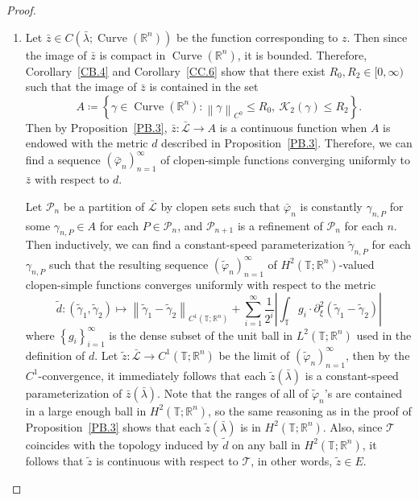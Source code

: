 \documentclass[reqno,centertags,12pt]{amsart}
\theoremstyle{definition}
\numberwithin{equation}{section}
\newcommand{\abs}[1]{\left\lvert#1\right\rvert}
\newcommand{\norm}[1]{\left\|#1\right\|}
\newcommand{\set}[1]{\left\{ #1 \right\}}
\newcommand{\setbc}[2]{\left\{ #1\colon#2 \right\}}
\newcommand{\seq}[1]{\left( #1 \right)}
\newcommand{\bbR}{{\mathbb{R}}}
\newcommand{\bbT}{{\mathbb{T}}}
\begin{document}
\begin{proof}
    \begin{enumerate}
        \item Let $\bar{z}\in C(\bar{\lambda};\operatorname{Curve}(\bbR^{n}))$ be the function
        corresponding to $z$. Then since the image of $\bar{z}$ is compact in
        $\operatorname{Curve}(\bbR^{n})$, it is bounded. Therefore,
        Corollary~\ref{CB.4} and
        Corollary~\ref{CC.6} show that
        there exist $R_{0},R_{2}\in[0,\infty)$ such that the image of $\bar{z}$
        is contained in the set
        \[
            A\coloneqq\setbc{\gamma\in\operatorname{Curve}(\bbR^{n})}
            {\norm{\gamma}_{C^{0}}\leq R_{0},\ \mathcal{K}_{2}(\gamma)\leq R_{2}}.
        \]
        Then by Proposition~\ref{PB.3},
        $\bar{z}\colon\bar{\mathcal{L}}\to A$ is a continuous function when $A$
        is endowed with the metric $d$ described in Proposition~\ref{PB.3}.
        Therefore, we can find a sequence
        $\seq{\bar{\varphi}_{n}}_{n=1}^{\infty}$ of clopen-simple functions
        converging uniformly to $\bar{z}$ with respect to $d$.

        Let $\mathcal{P}_{n}$ be a partition of $\bar{\mathcal{L}}$ by clopen sets
        such that $\bar{\varphi}_{n}$ is constantly $\gamma_{n,P}$ for some
        $\gamma_{n,P}\in A$ for each $P\in\mathcal{P}_{n}$,
        and $\mathcal{P}_{n+1}$ is a refinement of $\mathcal{P}_{n}$ for each $n$.
        Then inductively, we can find a constant-speed parameterization
        $\tilde{\gamma}_{n,P}$ for each $\gamma_{n,P}$ such that the resulting
        sequence $\seq{\tilde{\varphi}_{n}}_{n=1}^{\infty}$
        of $H^{2}(\bbT;\bbR^{n})$-valued clopen-simple functions converges uniformly
        with respect to the metric
        \[
            \tilde{d}\colon (\tilde{\gamma}_{1}, \tilde{\gamma}_{2})\mapsto
            \norm{\tilde{\gamma}_{1} - \tilde{\gamma}_{2}}_{C^{1}(\bbT;\bbR^{n})}
            + \sum_{i=1}^{\infty}\frac{1}{2^{i}}
            \abs{\int_{\bbT}g_{i}\cdot\partial_{\xi}^{2}
            (\tilde{\gamma}_{1} - \tilde{\gamma}_{2})}
        \]
        where $\set{g_{i}}_{i=1}^{\infty}$ is the dense subset of the unit ball in
        $L^{2}(\bbT;\bbR^{n})$ used in the definition of $d$.
        Let $\tilde{z}\colon\bar{\mathcal{L}}\to C^{1}(\bbT;\bbR^{n})$ be the limit of
        $\seq{\tilde{\varphi}_{n}}_{n=1}^{\infty}$, then by the $C^{1}$-convergence,
        it immediately follows that each $\tilde{z}(\bar{\lambda})$
        is a constant-speed parameterization of $\bar{z}(\bar{\lambda})$.
        Note that the ranges of all of $\tilde{\varphi}_{n}$'s are contained in
        a large enough ball in $H^{2}(\bbT;\bbR^{n})$, so the same reasoning
        as in the proof of Proposition~\ref{PB.3}
        shows that each $\tilde{z}(\bar{\lambda})$ is in $H^{2}(\bbT;\bbR^{n})$.
        Also, since $\mathscr{T}$ coincides with the topology induced by $\tilde{d}$
        on any ball in $H^{2}(\bbT;\bbR^{n})$, it follows that
        $\tilde{z}$ is continuous with respect to $\mathscr{T}$, in other words,
        $\tilde{z}\in E$. \\


\end{enumerate}
\end{proof}
\end{document}
